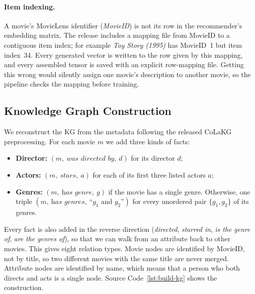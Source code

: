 \documentclass[a4paper,11pt]{article}
\begin{document}
\paragraph{Item indexing.} A movie's MovieLens identifier (\emph{MovieID}) is not its row in the recommender's embedding matrix. The release includes a mapping file from MovieID to a contiguous item index; for example \emph{Toy Story (1995)} has MovieID~1 but item index~34. Every generated vector is written to the row given by this mapping, and every assembled tensor is saved with an explicit row-mapping file. Getting this wrong would silently assign one movie's description to another movie, so the pipeline checks the mapping before training.

\subsection{Knowledge Graph Construction}
We reconstruct the KG from the metadata following the released CoLaKG preprocessing. For each movie $m$ we add three kinds of facts:
\begin{itemize}
    \item \textbf{Director:} $(m,\ \textit{was directed by},\ d)$ for its director $d$;
    \item \textbf{Actors:} $(m,\ \textit{stars},\ a)$ for each of its first three listed actors $a$;
    \item \textbf{Genres:} $(m,\ \textit{has genre},\ g)$ if the movie has a single genre. Otherwise, one triple
    $(m,\ \textit{has genres},\ \text{``}g_1 \text{ and } g_2\text{''})$
    for every unordered pair $\{g_1,g_2\}$ of its genres.
\end{itemize}
Every fact is also added in the reverse direction (\textit{directed}, \textit{starred in}, \textit{is the genre of}, \textit{are the genres of}), so that we can walk from an attribute back to other movies. This gives eight relation types. Movie nodes are identified by MovieID, not by title, so two different movies with the same title are never merged. Attribute nodes are identified by name, which means that a person who both directs and acts is a single node. Source Code~\ref{lst:build-kg} shows the construction.
\end{document}
